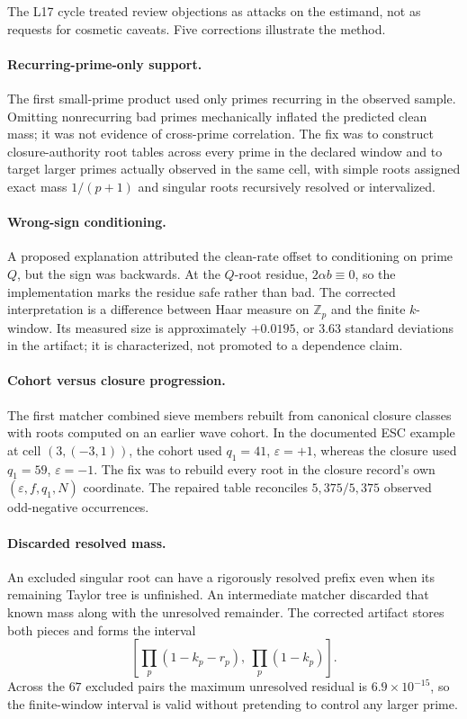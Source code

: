 \documentclass[11pt]{amsart}%
\newcommand{\Z}{\mathbb{Z}}
\begin{document}
The L17 cycle treated review objections as attacks on the estimand, not as
requests for cosmetic caveats.  Five corrections illustrate the method.

\paragraph{Recurring-prime-only support.}
The first small-prime product used only primes recurring in the observed
sample.  Omitting nonrecurring bad primes mechanically inflated the predicted
clean mass; it was not evidence of cross-prime correlation.  The fix was to
construct closure-authority root tables across every prime in the declared
window and to target larger primes actually observed in the same cell, with
simple roots assigned exact mass \(1/(p+1)\) and singular roots recursively
resolved or intervalized.

\paragraph{Wrong-sign conditioning.}
A proposed explanation attributed the clean-rate offset to conditioning on
prime \(Q\), but the sign was backwards.  At the \(Q\)-root residue,
\(2\alpha b\equiv0\), so the implementation marks the residue safe rather
than bad.  The corrected interpretation is a difference between Haar measure
on \(\Z_p\) and the finite \(k\)-window.  Its measured size is approximately
\(+0.0195\), or \(3.63\) standard deviations in the artifact; it is
characterized, not promoted to a dependence claim.

\paragraph{Cohort versus closure progression.}
The first matcher combined sieve members rebuilt from canonical closure
classes with roots computed on an earlier wave cohort.  In the documented ESC
example at cell \((3,(-3,1))\), the cohort used \(q_1=41\), \(\varepsilon=+1\),
whereas the closure used \(q_1=59\), \(\varepsilon=-1\).  The fix was to
rebuild every root in the closure record's own \((\varepsilon,f,q_1,N)\)
coordinate.  The repaired table reconciles \(5{,}375/5{,}375\) observed
odd-negative occurrences.

\paragraph{Discarded resolved mass.}
An excluded singular root can have a rigorously resolved prefix even when its
remaining Taylor tree is unfinished.  An intermediate matcher discarded that
known mass along with the unresolved remainder.  The corrected artifact stores
both pieces and forms the interval
\[
 \left[\prod_p(1-k_p-r_p),\ \prod_p(1-k_p)\right].
\]
Across the \(67\) excluded pairs the maximum unresolved residual is
\(6.9\times10^{-15}\), so the finite-window interval is valid without
pretending to control any larger prime.
\end{document}
